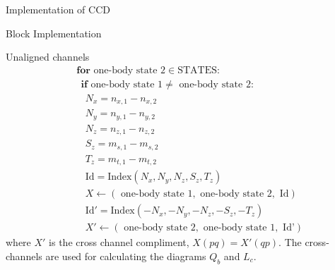 \documentclass[twoside,english]{uiofysmaster}
\begin{document}
\begin{chapter}{Implementation of CCD}
\begin{section}{Block Implementation}
\begin{subsection}{Unaligned channels}
\begin{align*}
				&\:\: \mathbf{for } \text{ one-body state 2} \in \text{STATES}:\\
				&\:\:\:\: \mathbf{if} \text{ one-body state 1} \neq \text{ one-body state 2}:\\
				&\:\:\:\:\:\: N_x = n_{x,1} - n_{x,2} \\
				&\:\:\:\:\:\: N_y = n_{y,1} - n_{y,2} \\
				&\:\:\:\:\:\: N_z = n_{z,1} - n_{z,2} \\
 				&\:\:\:\:\:\: S_z = m_{s,1} - m_{s,2} \\
				&\:\:\:\:\:\: T_z = m_{t,1} - m_{t,2} \\
				&\:\:\:\:\:\: \text{Id} = \text{Index}(N_x,N_y,N_z,S_z,T_z) \\
				&\:\:\:\:\:\: X \leftarrow (\text{ one-body state 1}, \text{ one-body state 2}, \text{ Id}) \\
				&\:\:\:\:\:\: \text{Id}' = \text{Index}(-N_x,-N_y,-N_z,-S_z,-T_z) \\
				&\:\:\:\:\:\: X' \leftarrow (\text{ one-body state 2}, \text{ one-body state 1}, \text{ Id'})
			\end{align*}
			where $X'$ is the cross channel compliment, $X(pq) = X'(qp)$. The cross-channels are used for calculating the diagrams $Q_b$ and $L_c$. 


\end{subsection}
\end{section}
\end{chapter}
\end{document}
